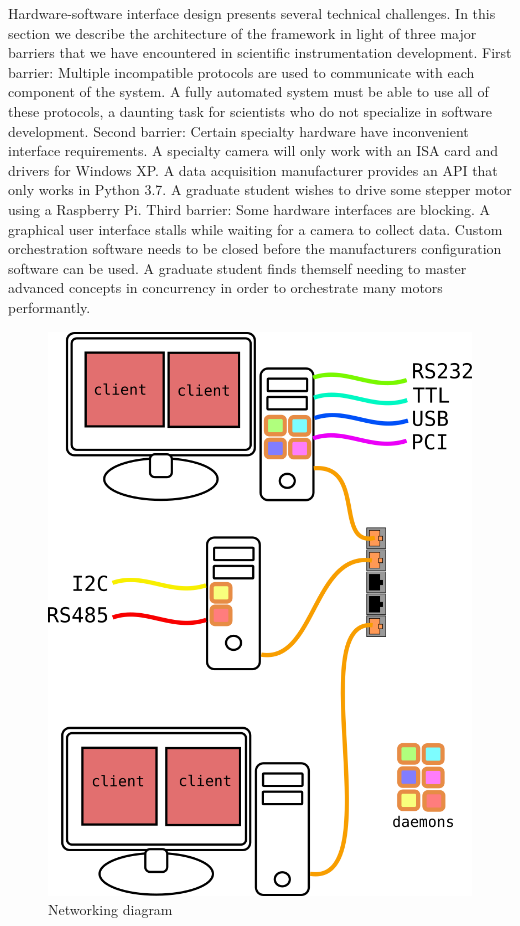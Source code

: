 Hardware-software interface design presents several technical challenges.
In this section we describe the architecture of the \yaq{} framework in light of three major barriers that we have encountered in scientific instrumentation development.
First barrier: Multiple incompatible protocols are used to communicate with each component of the system.
A fully automated system must be able to use all of these protocols, a daunting task for scientists who do not specialize in software development.
Second barrier: Certain specialty hardware have inconvenient interface requirements.
A specialty camera will only work with an ISA card and drivers for Windows XP.
A data acquisition manufacturer provides an API that only works in Python 3.7.
A graduate student wishes to drive some stepper motor using a Raspberry Pi.
Third barrier: Some hardware interfaces are blocking.
A graphical user interface stalls while waiting for a camera to collect data.
Custom orchestration software needs to be closed before the manufacturers configuration software can be used.
A graduate student finds themself needing to master advanced concepts in concurrency in order to orchestrate many motors performantly.

\begin{figure}
	\includegraphics[width=6in]{yaq/images/network}
\caption{\label{yaq:fig:network} Networking diagram}
\end{figure}

